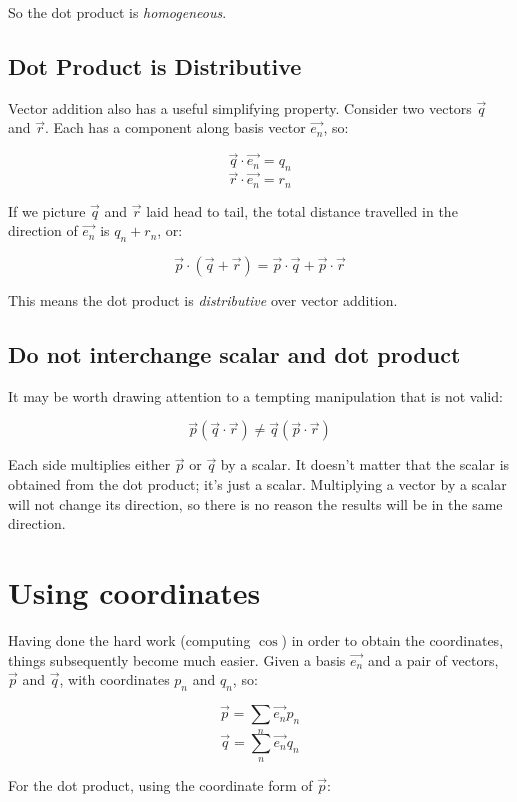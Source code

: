 So the dot product is \textit{homogeneous}.

\subsection{Dot Product is Distributive}

Vector addition also has a useful simplifying property. Consider two vectors $\vec{q}$ and $\vec{r}$. Each has a component along basis vector $\vec{e_n}$, so:

$$\vec{q} \cdot \vec{e_n} = q_n$$
$$\vec{r} \cdot \vec{e_n} = r_n$$

If we picture $\vec{q}$ and $\vec{r}$ laid head to tail, the total distance travelled in the direction of $\vec{e_n}$ is $q_n + r_n$, or:

$$
\vec{p} \cdot (\vec{q} +\vec{r} )
= \vec{p} \cdot \vec{q} +\vec{p} \cdot \vec{r}
$$

This means the dot product is \textit{distributive} over vector addition.

\subsection{Do not interchange scalar and dot product}

It may be worth drawing attention to a tempting manipulation that is not valid:

$$
\vec{p} \left( \vec{q} \cdot \vec{r} \right) \ne \vec{q} \left( \vec{p} \cdot \vec{r} \right)
$$

Each side multiplies either $\vec{p}$ or $\vec{q}$ by a scalar. It doesn't matter that the scalar is obtained from the dot product; it's just a scalar. Multiplying a vector by a scalar will not change its direction, so there is no reason the results will be in the same direction.

\section{Using coordinates}

Having done the hard work (computing $\cos$) in order to obtain the coordinates, things subsequently become much easier. Given a basis $\vec{e_n}$ and a pair of vectors, $\vec{p}$ and $\vec{q}$, with coordinates $p_n$ and $q_n$, so:

$$\vec{p} = \sum_n \vec{e_n}p_n$$
$$\vec{q} = \sum_n \vec{e_n}q_n$$

For the dot product, using the coordinate form of $\vec{p}$:

